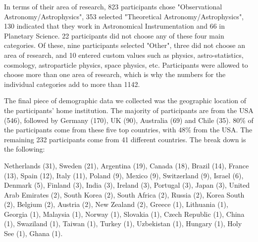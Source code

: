 In terms of their area of research, 823 participants chose "Observational Astronomy/Astrophysics", 353 selected "Theoretical Astronomy/Astrophysics", 130 indicated that they work in Astronomical Instrumentation and 66 in Planetary Science. 22 participants did not choose any of these four main categories. Of these, nine participants selected "Other", three did not choose an area of research, and 10 entered custom values such as physics, astro-statistics, cosmology, astroparticle physics, space physics, etc. Participants were allowed to choose more than one area of research, which is why the numbers for the individual categories add to more than 1142. 

The final piece of demographic data we collected was the geographic location of the participants' home institution. The majority of participants are from the USA (546), followed by Germany (170), UK (90), Australia (69) and Chile (35). 80\% of the participants come from these five top countries, with 48\% from the USA. The remaining 232 participants come from 41 different countries. The break down is the following:

             Netherlands     (31),
                  Sweden     (21),
               Argentina     (19),
                  Canada     (18),
                  Brazil     (14),
                  France     (13),
                   Spain     (12),
                   Italy     (11),
                  Poland      (9),
                  Mexico      (9),
             Switzerland      (9),
                  Israel      (6),
                 Denmark      (5),
                 Finland      (3),
                   India      (3),
                 Ireland      (3),
                Portugal      (3),
                   Japan      (3),
    United Arab Emirates      (2),
             South Korea      (2),
            South Africa      (2),
                  Russia      (2),
             Korea South      (2),
                 Belgium      (2),
                 Austria      (2),
             New Zealand      (2),
                  Greece      (1),
               Lithuania      (1),
                 Georgia      (1),
                Malaysia      (1),
                  Norway      (1),
                Slovakia      (1),
          Czech Republic      (1),
                   China      (1),
               Swaziland      (1),
                  Taiwan      (1),
                  Turkey      (1),
              Uzbekistan      (1),
                 Hungary      (1),
                Holy See      (1),
                   Ghana      (1).
                   
